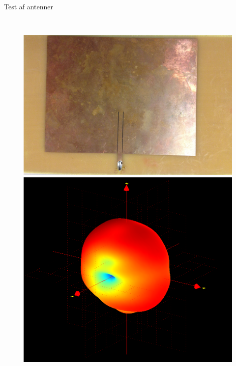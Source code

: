 \begin{frame}{Test af antenner}
\begin{minipage}{0.1\textwidth}
\textcolor{white}{.} 
\end{minipage}%
\begin{minipage}{0.45\textwidth}
\begin{figure}[!htbp]
	\centering
	\includegraphics[width = \columnwidth]{figures/PatchAnt.jpg}\\
	\includegraphics[width = \columnwidth]{figures/PatchNy858.png}
\end{figure}
\end{minipage}
\end{frame}


